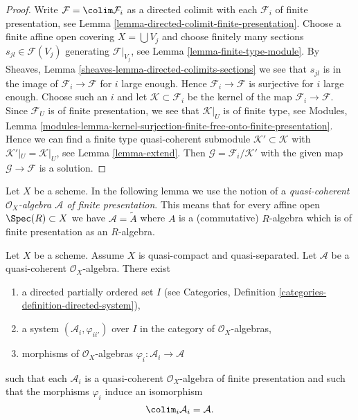 \begin{proof}
Write $\mathcal{F} = \colim \mathcal{F}_i$ as a directed colimit
with each $\mathcal{F}_i$ of finite presentation,
see Lemma \ref{lemma-directed-colimit-finite-presentation}.
Choose a finite affine open covering $X = \bigcup V_j$ and choose
finitely many sections $s_{jl} \in \mathcal{F}(V_j)$ generating
$\mathcal{F}|_{V_j}$, see Lemma \ref{lemma-finite-type-module}.
By Sheaves, Lemma \ref{sheaves-lemma-directed-colimits-sections}
we see that $s_{jl}$ is in the image of $\mathcal{F}_i \to \mathcal{F}$
for $i$ large enough. Hence $\mathcal{F}_i \to \mathcal{F}$ is surjective
for $i$ large enough. Choose such an $i$ and let
$\mathcal{K} \subset \mathcal{F}_i$ be the kernel of the map
$\mathcal{F}_i \to \mathcal{F}$. Since $\mathcal{F}_U$ is of finite
presentation, we see that $\mathcal{K}|_U$ is of finite type, see
Modules, Lemma
\ref{modules-lemma-kernel-surjection-finite-free-onto-finite-presentation}.
Hence we can find a finite type quasi-coherent submodule
$\mathcal{K}' \subset \mathcal{K}$ with $\mathcal{K}'|_U = \mathcal{K}|_U$,
see Lemma \ref{lemma-extend}. Then
$\mathcal{G} = \mathcal{F}_i/\mathcal{K}'$
with the given map $\mathcal{G} \to \mathcal{F}$ is a solution.
\end{proof}

\noindent
Let $X$ be a scheme. In the following lemma we use the notion
of a {\it quasi-coherent $\mathcal{O}_X$-algebra $\mathcal{A}$
of finite presentation}. This means that for every affine open
$\Spec(R) \subset X$ we have $\mathcal{A} = \widetilde{A}$
where $A$ is a (commutative) $R$-algebra which is of finite presentation
as an $R$-algebra.

\begin{lemma}
\label{lemma-algebra-directed-colimit-finite-presentation}
Let $X$ be a scheme. Assume $X$ is quasi-compact and quasi-separated.
Let $\mathcal{A}$ be a quasi-coherent $\mathcal{O}_X$-algebra.
There exist
\begin{enumerate}
\item a directed partially ordered set $I$ (see
Categories, Definition \ref{categories-definition-directed-system}),
\item a system $(\mathcal{A}_i, \varphi_{ii'})$
over $I$ in the category of $\mathcal{O}_X$-algebras,
\item morphisms of $\mathcal{O}_X$-algebras
$\varphi_i : \mathcal{A}_i \to \mathcal{A}$
\end{enumerate}
such that each $\mathcal{A}_i$ is a quasi-coherent $\mathcal{O}_X$-algebra
of finite presentation and such that the morphisms $\varphi_i$
induce an isomorphism
$$
\colim_i \mathcal{A}_i
=
\mathcal{A}.
$$
\end{lemma}

